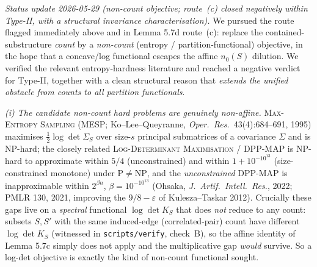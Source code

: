 \documentclass[
]{article}
\begin{document}
\emph{Status update 2026-05-29 (non-count objective; route~(c) closed
negatively \emph{within} Type-II, with a structural invariance
characterisation).} We pursued the route flagged immediately above and in
Lemma 5.7d route~(c): replace the contained-substructure \emph{count} by a
\emph{non-count} (entropy / partition-functional) objective, in the hope
that a concave/log functional escapes the affine $n_0(S)$ dilution. We
verified the relevant entropy-hardness literature and reached a negative
verdict for Type-II, together with a clean structural reason that
\emph{extends the unified obstacle from counts to all partition
functionals}.

\emph{(i) The candidate non-count hard problems are genuinely non-affine.}
\textsc{Max-Entropy Sampling} (MESP; Ko--Lee--Queyranne, \emph{Oper.\ Res.}\
43(4):684--691, 1995) maximises $\tfrac12\log\det\Sigma_S$ over size-$s$
principal submatrices of a covariance $\Sigma$ and is NP-hard; the closely
related \textsc{Log-Determinant Maximisation} / DPP-MAP is NP-hard to
approximate within $5/4$ (unconstrained) and within $1+10^{-10^{13}}$
(size-constrained monotone) under $\mathrm P\neq\mathrm{NP}$, and the
\emph{unconstrained} DPP-MAP is inapproximable within $2^{\beta n}$,
$\beta=10^{-10^{13}}$ (Ohsaka, \emph{J.\ Artif.\ Intell.\ Res.}, 2022;
PMLR 130, 2021, improving the $9/8-\varepsilon$ of Kulesza--Taskar 2012).
Crucially these gaps live on a \emph{spectral} functional $\log\det K_S$
that does \emph{not} reduce to any count: subsets $S,S'$ with the same
induced-edge (correlated-pair) count have different $\log\det K_S$
(witnessed in \texttt{scripts/verify}, check~B), so the affine identity of
Lemma 5.7c simply does not apply and the multiplicative gap \emph{would}
survive. So a log-det objective is exactly the kind of non-count functional
sought.
\end{document}
